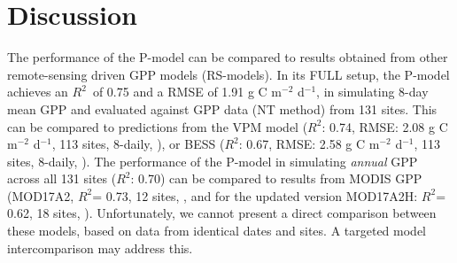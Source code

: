 \documentclass[gmd, manuscript]{copernicus}
\newcommand{\rsq}{$R^2$}
\begin{document}


\section{Discussion}
\label{sec:discussion}

The performance of the P-model can be compared to results obtained from other remote-sensing driven GPP models (RS-models). In its FULL setup, the P-model achieves an \rsq\ of 0.75 and a RMSE of 1.91 g C m$^{-2}$ d$^{-1}$, in simulating 8-day mean GPP and evaluated against GPP data (NT method) from 131 sites. This can be compared to predictions from the VPM model (\rsq : 0.74, RMSE: 2.08 g C m$^{-2}$ d$^{-1}$, 113 sites, 8-daily, \citet{Zhang2017-yr}), or BESS (\rsq : 0.67, RMSE: 2.58 g C m$^{-2}$ d$^{-1}$, 113 sites, 8-daily, \citet{jiang16rse}). The performance of the P-model in simulating \textit{annual} GPP across all 131 sites (\rsq : 0.70) can be compared to results from MODIS GPP (MOD17A2, \rsq = 0.73, 12 sites, \citet{heinsch06}, and for the updated version MOD17A2H: \rsq = 0.62, 18 sites, \citet{wang17rs}). Unfortunately, we cannot present a direct comparison between these models, based on data from identical dates and sites. A targeted model intercomparison may address this.
\end{document}
